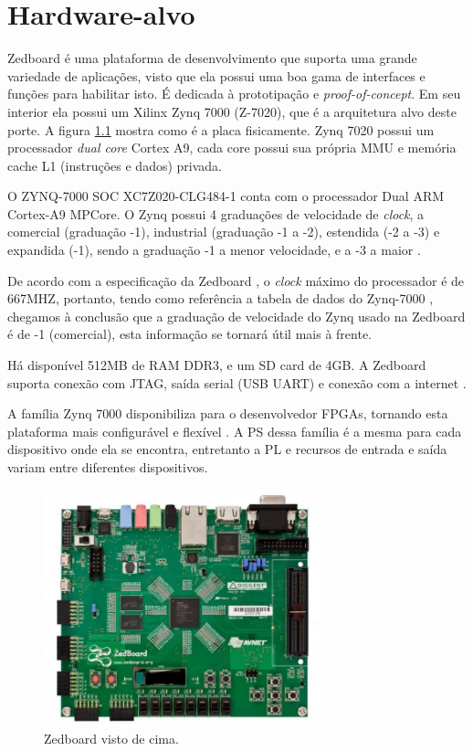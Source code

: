 \chapter{Hardware-alvo}

Zedboard é uma plataforma de desenvolvimento que suporta uma grande variedade de aplicações, visto que ela possui uma boa gama de interfaces e funções para habilitar isto. É dedicada à prototipação e \emph{proof-of-concept}. Em seu interior ela possui um Xilinx Zynq 7000 (Z-7020), que é a arquitetura alvo deste porte. A figura \ref{fig:zed} mostra como é a placa fisicamente. Zynq 7020 possui um processador \emph{dual core} Cortex A9, cada core possui sua própria MMU e memória cache L1 (instruções e dados) privada.

O ZYNQ-7000 SOC XC7Z020-CLG484-1 conta com o processador Dual ARM Cortex-A9 MPCore. O Zynq possui 4 graduações de velocidade de \emph{clock}, a comercial (graduação -1), industrial (graduação -1 a -2), estendida (-2 a -3) e expandida (-1), sendo a graduação -1 a menor velocidade, e a -3 a maior \cite{product_table}.

De acordo com a especificação da Zedboard \cite{zedboard}, o \emph{clock} máximo do processador é de 667MHZ, portanto, tendo como referência a tabela de dados do Zynq-7000 \cite[p.~13]{data_sheet}, chegamos à conclusão que a graduação de velocidade do Zynq usado na Zedboard é de -1 (comercial), esta informação se tornará útil mais à frente.

Há disponível 512MB de RAM DDR3, e um SD card de 4GB. A Zedboard suporta conexão com JTAG, saída serial (USB UART) e conexão com a internet \cite{xilinx}.

A família Zynq 7000 disponibiliza para o desenvolvedor FPGAs, tornando esta plataforma mais configurável e flexível \cite[p.~26]{ug585}. A PS dessa família é a mesma para cada dispositivo onde ela se encontra, entretanto a PL e recursos de entrada e saída variam entre diferentes dispositivos. 


\begin{figure}[ht!]
	\label{fig:zed}
    \centering
    \includegraphics[width=8cm]{figuras/zedboard}
    \caption{Zedboard visto de cima.}
\end{figure}

